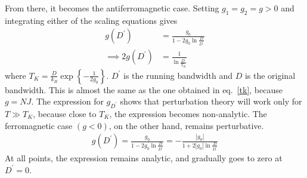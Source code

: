 From there, it becomes the antiferromagnetic case.
Setting \(g_1 = g_2 =g >0\) and integrating either of the scaling equations gives
\begin{equation}\begin{aligned}
	\label{isot}
g(D^\prime) &= \frac{g_0}{1-2g_0\ln\frac{D}{D^\prime}} \\
\implies 2g(D^\prime) &= \frac{1}{\ln \frac{D^\prime}{T_K}}
\end{aligned}\end{equation}
where \(T_K = \frac{D}{k_B} \exp\left\{-\frac{1}{2g_0}\right\}\).
\(D^\prime\) is the running bandwidth and \(D\) is the original bandwidth.
This is almost the same as the one obtained in eq.~\ref{tk}, because \(g = N J\).
The expression for \(g_{D^\prime}\) shows that perturbation theory will work only for \(T \gg T_K\), because close to \(T_K\), the expression becomes non-analytic.
The ferromagnetic case \((g<0)\), on the other hand, remains perturbative.
\begin{equation}\begin{aligned}
g(D^\prime) = \frac{g_0}{1-2g_0\ln\frac{D}{D^\prime}} = -\frac{|g_0|}{1+2|g_0|\ln\frac{D}{D^\prime}}
\end{aligned}\end{equation}
At all points, the expression remains analytic, and gradually goes to zero at \(D^\prime = 0\).

